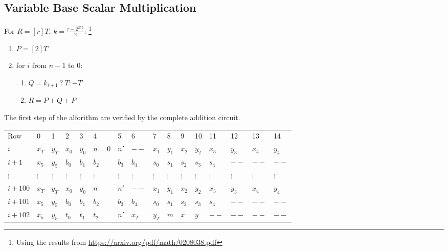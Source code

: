 \subsection{Variable Base Scalar Multiplication}
For $R  = [r]T$, $k = \frac{r - 2^{255}}{2}$:
\footnote{Using the results from \url{https://arxiv.org/pdf/math/0208038.pdf}}
\begin{enumerate}
    \item $P = [2]T$
    \item for $i$ from $n - 1$ to $0$:
    \begin{enumerate}
        \item $Q = k_{i + 1} \: ? \: T : -T$
        \item $R = P + Q + P$
    \end{enumerate}
\end{enumerate}

The first step of the alforithm are verified by the complete addition circuit. 

\begin{center}
    \begin{table}[H]
        \begin{tabular}{llllllllllllllll}
            Row     & 0        & 1        & 2        & 3        & 4        & 5        & 6        & 7        & 8        & 9        & 10       & 11       & 12       & 13       & 14       \\
            $i$    & $x_T$    & $y_T$    & $x_0$    & $y_0$    & $n = 0$    & $n'$    & $--$    & $x_1$    & $y_1$    & $x_2$    & $y_2$    & $x_3$    & $y_3$ & $x_4$ & $y_4$ \\
            $i + 1$   & $x_5$    & $y_5$    & $b_0$    & $b_1$    & $b_2$    & $b_3$    & $b_4$      & $s_0$    & $s_1$    & $s_2$    & $s_3$    & $s_4$    & $--$ & $--$ & $--$ \\
            $\vdots$  & $\vdots$ & $\vdots$ & $\vdots$ & $\vdots$ & $\vdots$ & $\vdots$ & $\vdots$ & $\vdots$ & $\vdots$ & $\vdots$ & $\vdots$ & $\vdots$ & $\vdots$ & $\vdots$ & $\vdots$ \\
            $i + 100$ & $x_T$    & $y_T$    & $x_0$    & $y_0$    & $n$    & $n'$    & $--$    & $x_1$    & $y_1$    & $x_2$    & $y_2$    & $x_3$    & $y_3$ & $x_4$ & $y_4$ \\
            $i + 101$ & $x_5$    & $y_5$    & $b_0$    & $b_1$    & $b_2$    & $b_3$    & $b_4$      & $s_0$    & $s_1$    & $s_2$    & $s_3$    & $s_4$    & $--$ & $--$ & $--$ \\
            $i + 102$ & $x_5$    & $y_5$    & $t_0$    & $t_1$    & $t_2$    & $n'$    & $x_T$      & $y_T$    & $m$    & $x$    & $y$    & $--$    & $--$ & $--$ & $--$ \\
        \end{tabular}
    \end{table}
\end{center}

